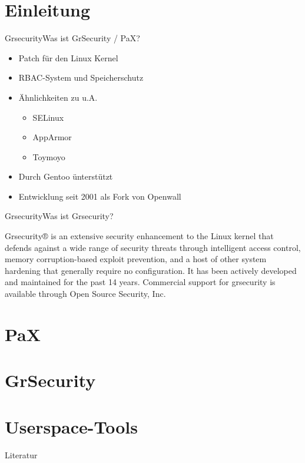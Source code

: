 

\mode*
\begin{frame}
    \titlepage
\end{frame}

\begin{frame}
    \tableofcontents
\end{frame}

\section{Einleitung}
\begin{frame}{Grsecurity}{Was ist GrSecurity / PaX?}
    \begin{itemize}
        \item Patch für den Linux Kernel
        \item RBAC-System und Speicherschutz
        \item Ähnlichkeiten zu u.A.
            \begin{itemize}
                \item SELinux
                \item AppArmor
                \item Toymoyo
            \end{itemize}
        \item Durch Gentoo ünterstützt
        \item Entwicklung seit 2001 als Fork von Openwall
    \end{itemize}
\end{frame}

\begin{frame}{Grsecurity}{Was ist Grsecurity?}
    \begin{Definition} %
        Grsecurity® is an extensive security enhancement to the Linux kernel that defends against a wide range of security threats through intelligent access control, memory corruption-based exploit prevention, and a host of other system hardening that generally require no configuration. It has been actively developed and maintained for the past 14 years. Commercial support for grsecurity is available through Open Source Security, Inc. \cite{grsechp}
    \end{Definition}
\end{frame}

\section{PaX}


\section{GrSecurity}

\section{Userspace-Tools}

\begin{frame}{Literatur}
    
    
\end{frame}


